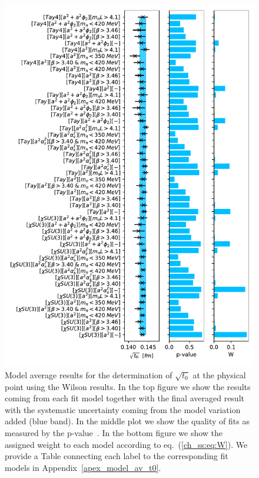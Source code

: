 \begin{figure}
    \centering
    \includegraphics[width=1.\textwidth]{./cap5/figs/BMA_w.pdf}
    \caption{Model average results for the determination of $\sqrt{t_0}$ at the physical point using the Wilson results. In the top figure we show the results coming from each fit model together with the final averaged result with the systematic uncertainty coming from the model variation added (blue band). In the middle plot we show the quality of fits as measured by the p-value~\citep{Bruno:2022mfy}. In the bottom figure we show the assigned weight to each model according to eq.~(\ref{ch_ss:eq:W}). We provide a Table connecting each label to the corresponding fit models in Appendix~\ref{apex_model_av_t0}.}
    \label{ch_ss:fig:BMA_w}
\end{figure}

